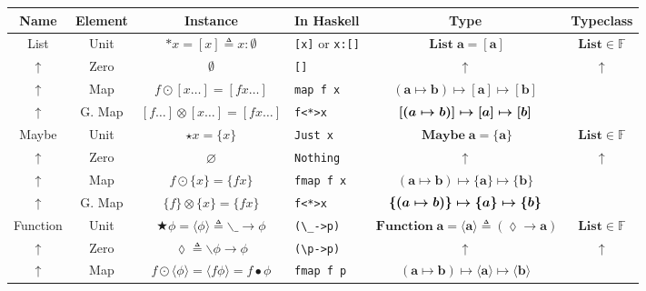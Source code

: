 \documentclass{jsarticle}
\newcommand{\boldsym}[1]{{\boldsymbol{#1}}}
\begin{document}
\begin{center}
\begin{tabular}{||c|c||c|l|c|c||}\hline
Name&Element&Instance&In Haskell&Type&Typeclass\\\hline
\hline
List
    &Unit
    &$\ast x=[x]\triangleq x:\emptyset$
    &\texttt{[x]} or \texttt{x:[]}
    &$\mathop{\textbf{List}}\mathbf{a}=\boldsym{[a]}$
    &$\textbf{List}\in\mathbb{F}$\\
    \hline
$\uparrow$
    &Zero
    &$\emptyset$
    &\texttt{[]}
    &$\uparrow$
    &$\uparrow$\\
    \hline
$\uparrow$
    &Map
    &$f\odot[x\dots]=[fx\dots]$
    &\texttt{map f x}
    &$(\mathbf{a}\mapsto\mathbf{b})\mapsto\boldsym{[a]}\mapsto\boldsym{[b]}$
    &\\
    \hline
$\uparrow$
    &G. Map
    &$[f\dots]\otimes[x\dots]=[fx\dots]$
    &\texttt{f<*>x}
    &$\boldsym{[}(\boldmath{a}\mapsto\boldmath{b})\boldsym{]}\mapsto\boldsym{[a]}\mapsto\boldsym{[b]}$
    &\\
    \hline
    \hline
Maybe
    &Unit
    &$\star x=\{x\}$
    &\texttt{Just x}
    &$\mathop{\textbf{Maybe}}\mathbf{a}=\boldsym{\{a\}}$
    &$\textbf{List}\in\mathbb{F}$\\
    \hline
$\uparrow$
    &Zero
    &$\varnothing$
    &\texttt{Nothing}
    &$\uparrow$
    &$\uparrow$\\
    \hline
$\uparrow$
    &Map
    &$f\odot\{x\}=\{fx\}$
    &\texttt{fmap f x}
    &$(\mathbf{a}\mapsto\mathbf{b})\mapsto\boldsym{\{a\}}\mapsto\boldsym{\{b\}}$
    &\\
    \hline
$\uparrow$
    &G. Map
    &$\{f\}\otimes\{x\}=\{fx\}$
    &\texttt{f<*>x}
    &$\boldsym{\{}(\boldmath{a}\mapsto\boldmath{b})\boldsym{\}}\mapsto\boldsym{\{a\}}\mapsto\boldsym{\{b\}}$
    &\\
    \hline
    \hline
Function
    &Unit
    &$\bigstar\phi=\langle\phi\rangle\triangleq \backslash\_\longrightarrow\phi$
    &\verb|(\_->p)|
    &$\mathop{\textbf{Function}}\mathbf{a}=\boldsym{\langle a\rangle}\triangleq(\lozenge\rightarrow\mathbf{a})$
    &$\textbf{List}\in\mathbb{F}$\\
    \hline
$\uparrow$
    &Zero
    &$\lozenge\triangleq\backslash\phi\longrightarrow\phi$
    &\verb|(\p->p)|
    &$\uparrow$
    &$\uparrow$\\
    \hline
$\uparrow$
    &Map
    &$f\odot\langle\phi\rangle=\langle f\phi\rangle=f\bullet\phi$
    &\texttt{fmap f p}
    &$(\mathbf{a}\mapsto\mathbf{b})\mapsto\boldsym{\langle a\rangle}\mapsto\boldsym{\langle b\rangle}$

\end{tabular}
\end{center}
\end{document}
